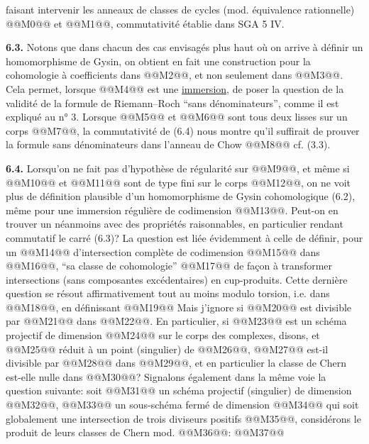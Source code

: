 
faisant intervenir les anneaux de classes de cycles (mod. équivalence rationnelle) @@M0@@ et @@M1@@, commutativité établie dans SGA 5 IV.

\textbf{6.3.} Notons que dans chacun des cas envisagés plus haut où on arrive à définir un homomorphisme de Gysin, on obtient en fait une construction pour la cohomologie à coefficients dans @@M2@@, et non seulement dans @@M3@@. Cela permet, lorsque @@M4@@ est une \uline{immersion}, de poser la question de la validité de la formule de Riemann--Roch ``sans dénominateurs'', comme il est expliqué au n° 3. Lorsque @@M5@@ et @@M6@@ sont tous deux lisses sur un corps @@M7@@, la commutativité de (6.4) nous montre qu'il suffirait de prouver la formule sans dénominateurs dans l'anneau de Chow @@M8@@ cf. (3.3).

\textbf{6.4.} Lorsqu'on ne fait pas d'hypothèse de régularité sur @@M9@@, et même si @@M10@@ et @@M11@@ sont de type fini sur le corps @@M12@@, on ne voit plus de définition plausible d'un homomorphisme de Gysin cohomologique (6.2), même pour une immersion régulière de codimension @@M13@@. Peut-on en trouver un néanmoins avec des propriétés raisonnables, en particulier rendant commutatif le carré (6.3)? La question est liée évidemment à celle de définir, pour un @@M14@@ d'intersection complète de codimension @@M15@@ dans @@M16@@, ``sa classe de cohomologie''
@@M17@@
de façon à transformer intersections (sans composantes excédentaires) en cup-produits. Cette dernière question se résout affirmativement tout au moins modulo torsion, i.e. dans @@M18@@, en définissant
@@M19@@
Mais j'ignore si @@M20@@ est divisible par @@M21@@ dans @@M22@@. En particulier, si @@M23@@ est un schéma projectif de dimension @@M24@@ sur le corps des complexes, disons, et @@M25@@ réduit à un point (singulier) de @@M26@@, @@M27@@ est-il divisible par @@M28@@ dans @@M29@@, et en particulier la classe de Chern est-elle nulle dans @@M30@@? Signalons également dans la même voie la question suivante: soit @@M31@@ un schéma projectif (singulier) de dimension @@M32@@, @@M33@@ un sous-schéma fermé de dimension @@M34@@ qui soit globalement une intersection de trois diviseurs positifs @@M35@@, considérons le produit de leurs classes de Chern mod. @@M36@@:
@@M37@@
